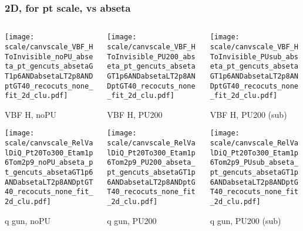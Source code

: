 \documentclass[8pt]{beamer}
\begin{document}
   \begin{frame}
  \frametitle{2D, for pt scale, vs abseta}
  
  \begin{columns}
   \begin{column}{0.35\textwidth}
     \texttt{[image: scale/canvscale\_VBF\_HToInvisible\_noPU\_abseta\_pt\_gencuts\_absetaGT1p6ANDabsetaLT2p8ANDptGT40\_recocuts\_none\_fit\_2d\_clu.pdf]}
     
     VBF H, noPU
    
     \texttt{[image: scale/canvscale\_RelValDiQ\_Pt20To300\_Etam1p6Tom2p9\_noPU\_abseta\_pt\_gencuts\_absetaGT1p6ANDabsetaLT2p8ANDptGT40\_recocuts\_none\_fit\_2d\_clu.pdf]}
     
     q gun, noPU
   \end{column}
   \begin{column}{0.35\textwidth}
     \texttt{[image: scale/canvscale\_VBF\_HToInvisible\_PU200\_abseta\_pt\_gencuts\_absetaGT1p6ANDabsetaLT2p8ANDptGT40\_recocuts\_none\_fit\_2d\_clu.pdf]}
     
     VBF H, PU200
    
     \texttt{[image: scale/canvscale\_RelValDiQ\_Pt20To300\_Etam1p6Tom2p9\_PU200\_abseta\_pt\_gencuts\_absetaGT1p6ANDabsetaLT2p8ANDptGT40\_recocuts\_none\_fit\_2d\_clu.pdf]}
     
     q gun, PU200
   \end{column}
   \begin{column}{0.35\textwidth}
     \texttt{[image: scale/canvscale\_VBF\_HToInvisible\_PUsub\_abseta\_pt\_gencuts\_absetaGT1p6ANDabsetaLT2p8ANDptGT40\_recocuts\_none\_fit\_2d\_clu.pdf]}
     
     VBF H, PU200 (sub)
    
     \texttt{[image: scale/canvscale\_RelValDiQ\_Pt20To300\_Etam1p6Tom2p9\_PUsub\_abseta\_pt\_gencuts\_absetaGT1p6ANDabsetaLT2p8ANDptGT40\_recocuts\_none\_fit\_2d\_clu.pdf]}
     
     q gun, PU200 (sub)
   \end{column}
  \end{columns}
 \end{frame}
 
\end{document}
